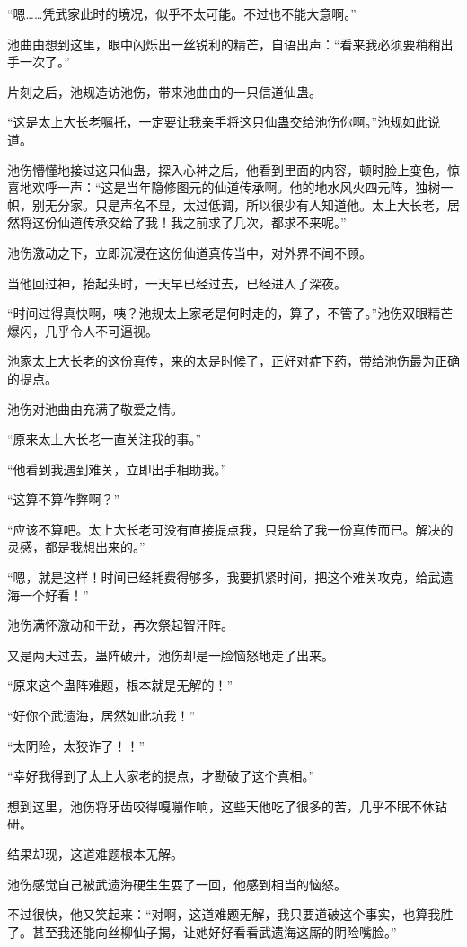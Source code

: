 \begin{this_body}
“嗯……凭武家此时的境况，似乎不太可能。不过也不能大意啊。”

池曲由想到这里，眼中闪烁出一丝锐利的精芒，自语出声：“看来我必须要稍稍出手一次了。”

片刻之后，池规造访池伤，带来池曲由的一只信道仙蛊。

“这是太上大长老嘱托，一定要让我亲手将这只仙蛊交给池伤你啊。”池规如此说道。

池伤懵懂地接过这只仙蛊，探入心神之后，他看到里面的内容，顿时脸上变色，惊喜地欢呼一声：“这是当年隐修图元的仙道传承啊。他的地水风火四元阵，独树一帜，别无分家。只是声名不显，太过低调，所以很少有人知道他。太上大长老，居然将这份仙道传承交给了我！我之前求了几次，都求不来呢。”

池伤激动之下，立即沉浸在这份仙道真传当中，对外界不闻不顾。

当他回过神，抬起头时，一天早已经过去，已经进入了深夜。

“时间过得真快啊，咦？池规太上家老是何时走的，算了，不管了。”池伤双眼精芒爆闪，几乎令人不可逼视。

池家太上大长老的这份真传，来的太是时候了，正好对症下药，带给池伤最为正确的提点。

池伤对池曲由充满了敬爱之情。

“原来太上大长老一直关注我的事。”

“他看到我遇到难关，立即出手相助我。”

“这算不算作弊啊？”

“应该不算吧。太上大长老可没有直接提点我，只是给了我一份真传而已。解决的灵感，都是我想出来的。”

“嗯，就是这样！时间已经耗费得够多，我要抓紧时间，把这个难关攻克，给武遗海一个好看！”

池伤满怀激动和干劲，再次祭起智汗阵。

又是两天过去，蛊阵破开，池伤却是一脸恼怒地走了出来。

“原来这个蛊阵难题，根本就是无解的！”

“好你个武遗海，居然如此坑我！”

“太阴险，太狡诈了！！”

“幸好我得到了太上大家老的提点，才勘破了这个真相。”

想到这里，池伤将牙齿咬得嘎嘣作响，这些天他吃了很多的苦，几乎不眠不休钻研。

结果却现，这道难题根本无解。

池伤感觉自己被武遗海硬生生耍了一回，他感到相当的恼怒。

不过很快，他又笑起来：“对啊，这道难题无解，我只要道破这个事实，也算我胜了。甚至我还能向丝柳仙子揭，让她好好看看武遗海这厮的阴险嘴脸。”


\end{this_body}

